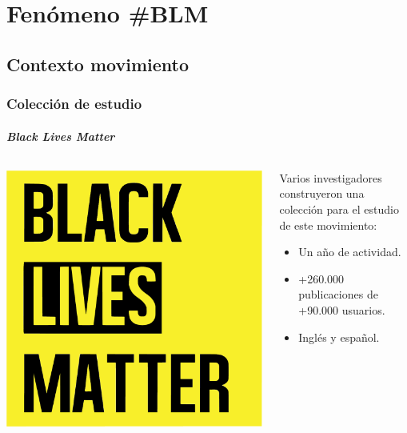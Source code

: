 \documentclass{beamer}
\begin{document}
\section{Fenómeno \#BLM}
\subsection{Contexto movimiento}
\begin{frame}
	\frametitle{Colección de estudio}
	\framesubtitle{\textit{Black Lives Matter}}
	
	\begin{columns}[T] %
		\begin{column}{0.5\textwidth}
			\includegraphics[width=\textwidth]{blm}
		\end{column}
		\begin{column}{0.5\textwidth}
			\pause
			Varios investigadores construyeron una colección para el estudio de este movimiento:
			\begin{itemize}
				\item Un año de actividad.
				\item +260.000 publicaciones de +90.000 usuarios.
				\item Inglés y español.
			\end{itemize}
		\end{column}
	\end{columns}
\end{frame}
\end{document}
